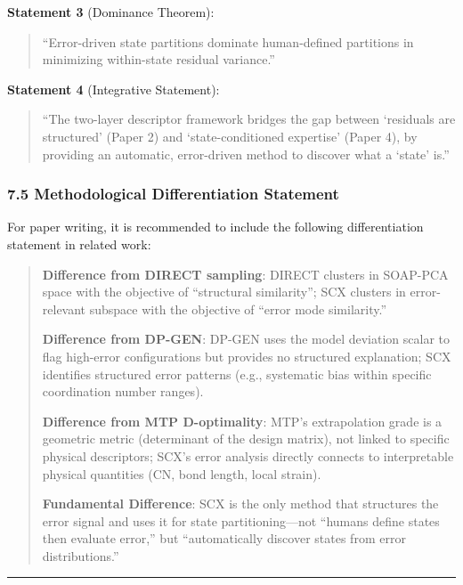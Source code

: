 \documentclass[
  12pt,
]{article}
\begin{document}
\textbf{Statement 3} (Dominance Theorem):
\begin{quote}
``Error-driven state partitions dominate human-defined partitions in minimizing within-state residual variance.''
\end{quote}

\textbf{Statement 4} (Integrative Statement):
\begin{quote}
``The two-layer descriptor framework bridges the gap between `residuals are structured' (Paper 2) and `state-conditioned expertise' (Paper 4), by providing an automatic, error-driven method to discover what a `state' is.''
\end{quote}

\subsubsection{7.5 Methodological Differentiation Statement}\label{methodological-differentiation}

For paper writing, it is recommended to include the following differentiation statement in related work:

\begin{quote}
\textbf{Difference from DIRECT sampling}: DIRECT clusters in SOAP-PCA space with the objective of ``structural similarity''; SCX clusters in error-relevant subspace with the objective of ``error mode similarity.''

\textbf{Difference from DP-GEN}: DP-GEN uses the model deviation scalar to flag high-error configurations but provides no structured explanation; SCX identifies structured error patterns (e.g., systematic bias within specific coordination number ranges).

\textbf{Difference from MTP D-optimality}: MTP's extrapolation grade is a geometric metric (determinant of the design matrix), not linked to specific physical descriptors; SCX's error analysis directly connects to interpretable physical quantities (CN, bond length, local strain).

\textbf{Fundamental Difference}: SCX is the only method that structures the error signal and uses it for state partitioning---not ``humans define states then evaluate error,'' but ``automatically discover states from error distributions.''
\end{quote}

\begin{center}\rule{0.5\linewidth}{0.5pt}\end{center}
\end{document}

